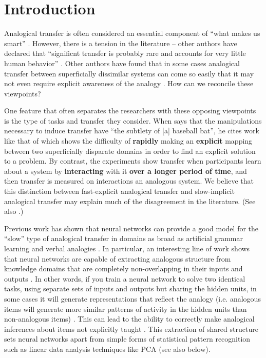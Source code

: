\documentclass[10pt,letterpaper]{article}
\begin{document}
\section{Introduction}
Analogical transfer is often considered an essential component of ``what makes us smart'' \citep{Gentner2003}. However, there is a tension in the literature -- other authors have declared that ``significnt transfer is probably rare and accounts for very little human behavior'' \citep{Detterman1993}. Other authors have found that in some cases analogical transfer between superficially dissimilar systems can come so easily that it may not even require explicit awareness of the analogy \citep{Day2011}. How can we reconcile these viewpoints? \par
One feature that often separates the researchers with these opposing viewpoints is the type of tasks and transfer they consider. When \citet{Detterman1993} says that the manipulations necessary to induce transfer have ``the subtlety of [a] baseball bat'', he cites work like that of \citet{Gick1980} which shows the difficulty of \textbf{rapidly} making an \textbf{explicit} mapping between two superficially disparate domains in order to find an explicit solution to a problem. By contrast, the \citet{Day2011} experiments show transfer when participants learn about a system by \textbf{interacting} with it \textbf{over a longer period of time}, and then transfer is measured on interactions an analogous system. We believe that this distinction between fast-explicit analogical transfer and slow-implicit analogical transfer may explain much of the disagreement in the literature. (See also \citet{Bransford1999}.)\par 
Previous work has shown that neural networks can provide a good model for the ``slow'' type of analogical transfer in domains as broad as artificial grammar learning \citep{Dienes1999} and verbal analogies \cite{Kollias2013}. In particular, an interesting line of work shows that neural networks are capable of extracting analogous structure from knowledge domains that are completely non-overlapping in their inputs and outputs \citep{Hinton1986,Rogers2008a}. In other words, if you train a neural network to solve two identical tasks, using separate sets of inputs and outputs but sharing the hidden units, in some cases it will generate representations that reflect the analogy (i.e. analogous items will generate more similar patterns of activity in the hidden units than non-analogous items) \citep{Rogers2008a}. This can lead to the ability to correctly make analogical inferences about items not explicitly taught \citep{Hinton1986}. This extraction of shared structure sets neural networks apart from simple forms of statistical pattern recognition \citep{Rogers2008a} such as linear data analysis techniques like PCA (see also below). \par
\end{document}
